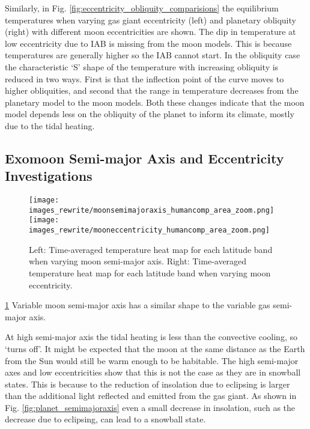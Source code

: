 \documentclass[12pt, onecolumn]{revtex4-2}    %
\begin{document}
Similarly, in Fig. \ref{fig:eccentricity_obliquity_comparisions} the equilibrium temperatures when varying gas giant eccentricity (left) and planetary obliquity (right) with different moon eccentricities are shown.
The dip in temperature at low eccentricity due to IAB is missing from the moon models.
This is because temperatures are generally higher so the IAB cannot start.
In the obliquity case the characteristic `S' shape of the temperature with increasing obliquity is reduced in two ways.
First is that the inflection point of the curve moves to higher obliquities, and second that the range in temperature decreases from the planetary model to the moon models.
Both these changes indicate that the moon model depends less on the obliquity of the planet to inform its climate, mostly due to the tidal heating.

\subsection{Exomoon Semi-major Axis and Eccentricity Investigations} \label{ssec:Exomoon_specific_results}
%
\begin{figure}[t]
  \texttt{[image: images\_rewrite/moonsemimajoraxis\_humancomp\_area\_zoom.png]}
  \texttt{[image: images\_rewrite/mooneccentricity\_humancomp\_area\_zoom.png]}
  \caption{
    Left:  Time-averaged temperature heat map for each latitude band when varying moon semi-major axis.
    Right: Time-averaged temperature heat map for each latitude band when varying moon eccentricity.
  }
  \label{fig:moon_semimajoraxis_eccentricity}
\end{figure}

\ref{fig:moon_semimajoraxis_eccentricity}
Variable moon semi-major axis has a similar shape to the variable gas semi-major axis.

At high semi-major axis the tidal heating is less than the convective cooling, so `turns off'.
It might be expected that the moon at the same distance as the Earth from the Sun would still be warm enough to be habitable.
The high semi-major axes and low eccentricities show that this is not the case as they are in snowball states.
This is because to the reduction of insolation due to eclipsing is larger than the additional light reflected and emitted from the gas giant.
As shown in Fig. \ref{fig:planet_semimajoraxis} even a small decrease in insolation, such as the decrease due to eclipsing, can lead to a snowball state.
\end{document}
